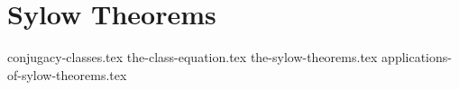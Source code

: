 \chapter{Sylow Theorems}
{conjugacy-classes.tex}
{the-class-equation.tex}
{the-sylow-theorems.tex}
{applications-of-sylow-theorems.tex}
